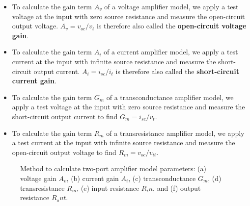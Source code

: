 \documentclass[
  11pt,
  letterpaper,
  abstract]{scrbook}
\begin{document}
\begin{itemize}
\item
  To calculate the gain term \(A_v\) of a voltage amplifier model, we
  apply a test voltage at the input with zero source resistance and
  measure the open-circuit output voltage. \(A_v = v_{oc} / v_t\) is
  therefore also called the \textbf{open-circuit voltage gain}.
\item
  To calculate the gain term \(A_i\) of a current amplifier model, we
  apply a test current at the input with infinite source resistance and
  measure the short-circuit output current. \(A_i = i_{sc} / i_t\) is
  therefore also called the \textbf{short-circuit current gain}.
\item
  To calculate the gain term \(G_m\) of a transconductance amplifier
  model, we apply a test voltage at the input with zero source
  resistance and measure the short-circuit output current to find
  \(G_m = i_{sc}/v_t\).
\item
  To calculate the gain term \(R_m\) of a transresistance amplifier
  model, we apply a test current at the input with infinite source
  resistance and measure the open-circuit output voltage to find
  \(R_m = v_{oc} / v_{it}\).
\end{itemize}

\begin{figure}


\caption{\label{fig-1.13}Method to calculate two-port amplifier model
parameters: (a) voltage gain \(A_v\), (b) current gain \(A_i\), (c)
transconductance \(G_m\), (d) transresistance \(R_m\), (e) input
resistance \(R_in\), and (f) output resistance \(R_out\).}

\end{figure}%
\end{document}
